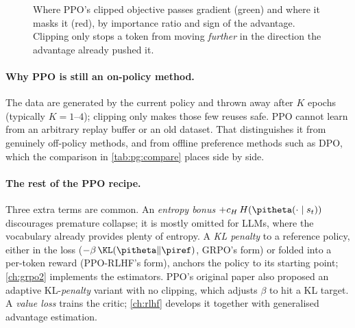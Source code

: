 \begin{figure}[t]
\centering
{}
\caption{Where PPO's clipped objective passes gradient (green) and where it masks it (red), by
importance ratio and sign of the advantage. Clipping only stops a token from moving
\emph{further} in the direction the advantage already pushed it.}
\label{fig:pg:clipmask}
\end{figure}

\paragraph{Why PPO is still an on-policy method.} The data are generated by the current policy
and thrown away after $K$ epochs (typically $K=1$--$4$); clipping only makes those few
reuses safe. PPO cannot learn from an arbitrary replay buffer or an old dataset. That
distinguishes it from genuinely off-policy methods, and from offline preference methods such
as DPO, which the comparison in \cref{tab:pg:compare} places side by side.

\paragraph{The rest of the PPO recipe.} Three extra terms are common. An \emph{entropy bonus}
$+c_H\,H(\pitheta(\cdot\mid s_t))$ discourages premature collapse; it is mostly omitted for
LLMs, where the vocabulary already provides plenty of entropy. A \emph{KL penalty} to a
reference policy, either in the loss ($-\beta\,\KL(\pitheta\|\piref)$, GRPO's form) or folded
into a per-token reward (PPO-RLHF's form), anchors the policy to its starting point;
\cref{ch:grpo2} implements the estimators. PPO's original paper also proposed an adaptive
KL-\emph{penalty} variant with no clipping, which adjusts $\beta$ to hit a KL target. A
\emph{value loss} trains the critic; \cref{ch:rlhf} develops it together with generalised
advantage estimation.

